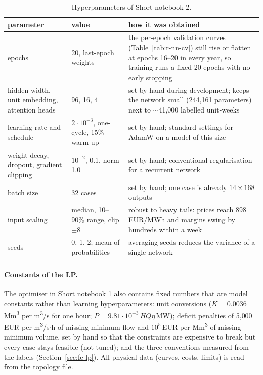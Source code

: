 \documentclass[11pt]{article}
\begin{document}
\begin{table}[H]
\centering\small
\begin{tabularx}{\linewidth}{L{4.2cm}L{3.2cm}Y}
\toprule
parameter & value & how it was obtained \\
\midrule
epochs & 20, last-epoch weights & the per-epoch validation curves (Table~\ref{tab:r-nn-cv}) still rise or
  flatten at epochs 16--20 in every year, so training runs a fixed 20 epochs with no early stopping \\
hidden width, unit embedding, attention heads & 96, 16, 4 & set by hand during development; keeps the
  network small (244{,}161 parameters) next to $\sim$41{,}000 labelled unit-weeks \\
learning rate and schedule & $2\cdot10^{-3}$, one-cycle, 15\% warm-up & set by hand; standard settings for
  AdamW on a model of this size \\
weight decay, dropout, gradient clipping & $10^{-2}$, 0.1, norm 1.0 & set by hand; conventional
  regularisation for a recurrent network \\
batch size & 32 cases & set by hand; one case is already $14 \times 168$ outputs \\
input scaling & median, 10--90\% range, clip $\pm 8$ & robust to heavy tails: prices reach
  898\,EUR/MWh and margins swing by hundreds within a week \\
seeds & 0, 1, 2; mean of probabilities & averaging seeds reduces the variance of a single network \\
\bottomrule
\end{tabularx}
\caption{Hyperparameters of Short notebook 2.}
\end{table}

\paragraph{Constants of the LP.} The optimiser in Short notebook 1 also contains fixed numbers that are
model constants rather than learning hyperparameters: unit conversions ($K = 0.0036$\,Mm\textsuperscript{3}
per m\textsuperscript{3}/s for one hour; $P = 9.81\cdot10^{-3}\,H Q \eta$\,MW); deficit penalties of
5{,}000\,EUR per m\textsuperscript{3}/s$\cdot$h of missing minimum flow and $10^5$\,EUR per
Mm\textsuperscript{3} of missing minimum volume, set by hand so that the constraints are expensive to
break but every case stays feasible (not tuned); and the three conventions measured from the labels
(Section~\ref{sec:fe-lp}). All physical data (curves, costs, limits) is read from the topology file.
\end{document}
